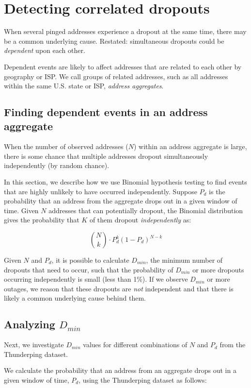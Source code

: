 \section{Detecting correlated dropouts}
\label{sec:method}

When several pinged addresses experience a dropout at the same time,
there may be a common underlying cause. Restated: simultaneous dropouts
could be \emph{dependent} upon each other.

Dependent events are likely to affect addresses that are related to
each other by geography or ISP. We call groups of related addresses, such as all addresses within the
same U.S. state or ISP, \emph{address aggregates}.

\subsection{Finding dependent events in an address aggregate}

When the number of observed addresses ($N$) within an address
aggregate is large, there is some chance that multiple addresses dropout
simultaneously independently (by random chance).

In this section, we describe how we use Binomial hypothesis testing to find events that
are highly unlikely to have occurred independently. Suppose $P_d$ is
the probability that an address from the aggregate drops out in a given window of time. Given
$N$ addresses that can potentially dropout, the Binomial distribution gives the probability that
$K$ of them dropout \emph{independently} as:

\[
{N\choose k} \cdot P_d^k(1-P_d)^{N-k}
\]

Given $N$ and $P_d$, it is possible to calculate $D_{min}$, the minimum number of
dropouts that need to occur, such that the probability of
$D_{min}$ or more dropouts occurring independently is small (less
than 1\%). If we observe $D_{min}$ or more outages, we reason that these dropouts are \emph{not} independent
and that there is likely a common underlying cause behind them.

\subsection{Analyzing $D_{min}$}

Next, we investigate $D_{min}$ values for different combinations of
$N$ and $P_d$ from the Thunderping dataset.

We calculate the probability that an address from an aggregate drops
out in a given window of time, $P_d$, using the Thunderping
dataset as follows:


